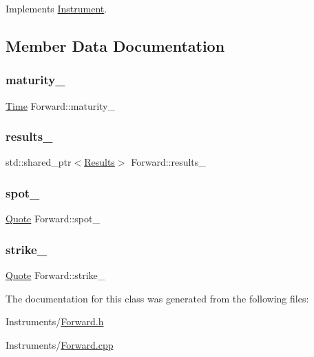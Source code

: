 Implements \hyperlink{class_instrument_a5cd384be384fe415f09ecc78e2a87539}{Instrument}.



\subsection{Member Data Documentation}
\hypertarget{class_forward_ad599104a13c33fbf31e9214af904e9aa}{}\label{class_forward_ad599104a13c33fbf31e9214af904e9aa} 
\subsubsection{\texorpdfstring{maturity\+\_\+}{maturity\_}}
{\footnotesize\ttfamily \hyperlink{_name_def_8h_ac2d3e0ba793497bcca555c7c2cf64ff3}{Time} Forward\+::maturity\+\_\+\hspace{0.3cm}{\ttfamily [private]}}

\hypertarget{class_forward_abead12e748980177fb67f98bcffbf817}{}\label{class_forward_abead12e748980177fb67f98bcffbf817} 
\subsubsection{\texorpdfstring{results\+\_\+}{results\_}}
{\footnotesize\ttfamily std\+::shared\+\_\+ptr$<$\hyperlink{class_forward_1_1_results}{Results}$>$ Forward\+::results\+\_\+}

\hypertarget{class_forward_a362d0396ceda462e504f77120339f8b0}{}\label{class_forward_a362d0396ceda462e504f77120339f8b0} 
\subsubsection{\texorpdfstring{spot\+\_\+}{spot\_}}
{\footnotesize\ttfamily \hyperlink{_name_def_8h_a642a6c5fd87319d922637de0e0bb0305}{Quote} Forward\+::spot\+\_\+\hspace{0.3cm}{\ttfamily [private]}}

\hypertarget{class_forward_a17c32d0a673c13fd92288b1720a43b76}{}\label{class_forward_a17c32d0a673c13fd92288b1720a43b76} 
\subsubsection{\texorpdfstring{strike\+\_\+}{strike\_}}
{\footnotesize\ttfamily \hyperlink{_name_def_8h_a642a6c5fd87319d922637de0e0bb0305}{Quote} Forward\+::strike\+\_\+\hspace{0.3cm}{\ttfamily [private]}}



The documentation for this class was generated from the following files\+:\begin{DoxyCompactItemize}
\item 
Instruments/\hyperlink{_forward_8h}{Forward.\+h}\item 
Instruments/\hyperlink{_forward_8cpp}{Forward.\+cpp}\end{DoxyCompactItemize}
